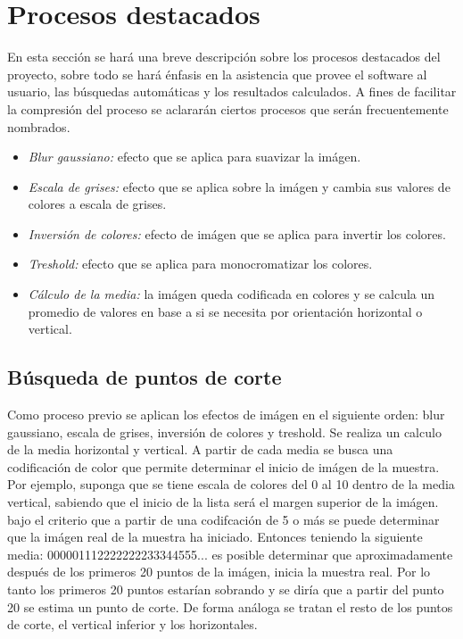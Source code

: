 \section{Procesos destacados}
En esta secci\'on se har\'a una breve descripci\'on sobre los procesos destacados del proyecto, sobre todo se har\'a \'enfasis en la asistencia que provee el software al usuario, las b\'usquedas autom\'aticas y los resultados calculados.
A fines de facilitar la compresi\'on del proceso se aclarar\'an ciertos procesos que ser\'an frecuentemente nombrados.
\begin{itemize}
	\renewcommand{\labelitemi}{$\bullet$}
	\renewcommand{\labelitemii}{$\circ$}
	
	\item \textit{Blur gaussiano:} efecto que se aplica para suavizar la im\'agen.
	\item \textit{Escala de grises:} efecto que se aplica sobre la im\'agen y cambia sus valores de colores a escala de grises.
	\item \textit{Inversi\'on de colores:} efecto de im\'agen que se aplica para invertir los colores.
	\item \textit{Treshold:} efecto que se aplica para monocromatizar los colores.
	\item \textit{C\'alculo de la media:} la im\'agen queda codificada en colores y se calcula un promedio de valores en base a si se necesita por orientaci\'on horizontal o vertical.
\end{itemize}

\subsection{B\'usqueda de puntos de corte}
Como proceso previo se aplican los efectos de im\'agen en el siguiente orden: blur gaussiano, escala de grises, inversi\'on de colores y treshold. Se realiza un calculo de la media horizontal y vertical. A partir de cada media se busca una codificaci\'on de color que permite determinar el inicio de im\'agen de la muestra. Por ejemplo, suponga que se tiene escala de colores del 0 al 10 dentro de la media vertical, sabiendo que el inicio de la lista ser\'a el margen superior de la im\'agen. bajo el criterio que a partir de una codifcaci\'on de 5 o m\'as se puede determinar que la im\'agen real de la muestra ha iniciado. Entonces teniendo la siguiente media: 000001112222222233344555... es posible determinar que aproximadamente despu\'es de los primeros 20 puntos de la im\'agen, inicia la muestra real. Por lo tanto los primeros 20 puntos estar\'ian sobrando y se dir\'ia que a partir del punto 20 se estima un punto de corte. De forma an\'aloga se tratan el resto de los puntos de corte, el vertical inferior y los horizontales.

